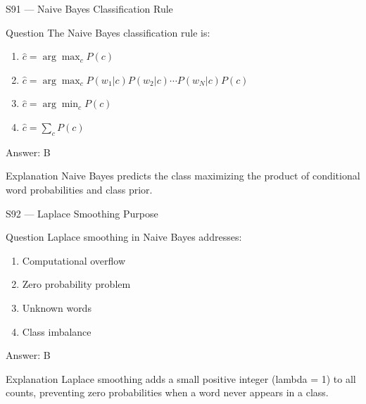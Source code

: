 \documentclass[aspectratio=169,8pt]{beamer}
\begin{document}
	\begin{frame}{S91 --- Naive Bayes Classification Rule}
		\begin{block}{Question}
			The Naive Bayes classification rule is:
			\begin{enumerate}
				\item $\hat{c} = \arg\max_c P(c)$
				\item $\hat{c} = \arg\max_c P(w_1|c)P(w_2|c)\cdots P(w_N|c)P(c)$
				\item $\hat{c} = \arg\min_c P(c)$
				\item $\hat{c} = \sum_c P(c)$
			\end{enumerate}
		\end{block}
		\begin{exampleblock}{Answer: B}\end{exampleblock}
		\begin{block}{Explanation}
			Naive Bayes predicts the class maximizing the product of conditional word probabilities and class prior.
		\end{block}
	\end{frame}
	
	\begin{frame}{S92 --- Laplace Smoothing Purpose}
		\begin{block}{Question}
			Laplace smoothing in Naive Bayes addresses:
			\begin{enumerate}
				\item Computational overflow
				\item Zero probability problem
				\item Unknown words
				\item Class imbalance
			\end{enumerate}
		\end{block}
		\begin{exampleblock}{Answer: B}\end{exampleblock}
		\begin{block}{Explanation}
			Laplace smoothing adds a small positive integer (lambda = 1) to all counts, preventing zero probabilities when a word never appears in a class.
		\end{block}
	\end{frame}
	
\end{document}
